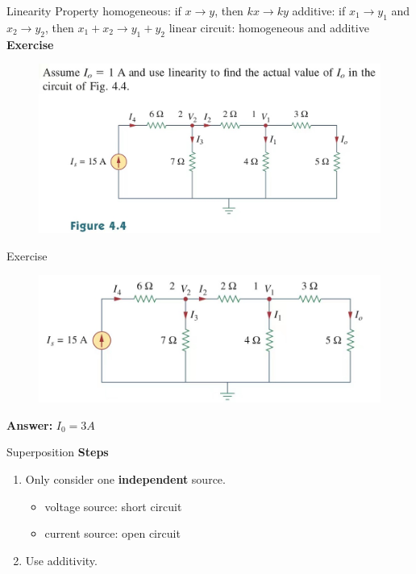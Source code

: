 \documentclass{beamer}
\begin{document}
\begin{frame}{Linearity Property}
homogeneous: if $x\rightarrow y$, then $kx\rightarrow ky$
\newline
additive: if $x_1\rightarrow y_1$ and $x_2\rightarrow y_2$, then $x_1+x_2\rightarrow y_1+y_2$
\newline
linear circuit: homogeneous and additive
\newline
\textbf{Exercise}
\begin{figure}
\centering
\includegraphics[scale=0.2]{img_cir/1.jpg}
\end{figure}
\end{frame}


\begin{frame}{Exercise}
\begin{figure}
\centering
\includegraphics[scale=0.2]{img_cir/2.jpg}
\end{figure}
\textbf{Answer:} $I_0=3A$
\end{frame}


\begin{frame}{Superposition}
\textbf{Steps}
\newline
\begin{enumerate}
\item Only consider one \textbf{independent} source.
\begin{itemize}
\item voltage source: short circuit
\item current source: open circuit
\newline
\end{itemize}
\item Use additivity.
\end{enumerate}
\end{frame}
\end{document}
